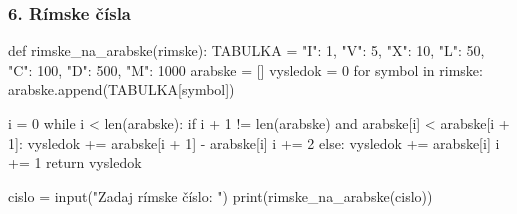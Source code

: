 \subsubsection*{6. Rímske čísla}
\begin{solution}
def rimske_na_arabske(rimske):
    TABULKA = {"I": 1, "V": 5, "X": 10, "L": 50, "C": 100, "D": 500, "M": 1000}
    arabske = []
    vysledok = 0
    for symbol in rimske:
        arabske.append(TABULKA[symbol])

    i = 0
    while i < len(arabske):
        if i + 1 != len(arabske) and arabske[i] < arabske[i + 1]:
            vysledok += arabske[i + 1] - arabske[i]
            i += 2
        else:
            vysledok += arabske[i]
            i += 1
    return vysledok

cislo = input("Zadaj rímske číslo: ")
print(rimske_na_arabske(cislo))
\end{solution}

